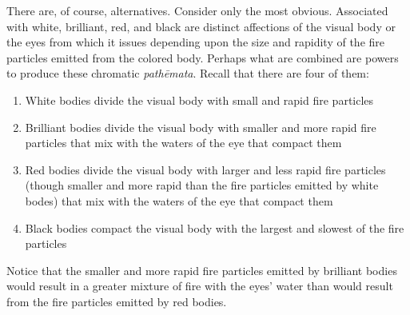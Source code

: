 There are, of course, alternatives. Consider only the most obvious. Associated with white, brilliant, red, and black are distinct affections of the visual body or the eyes from which it issues depending upon the size and rapidity of the fire particles emitted from the colored body. Perhaps what are combined are powers to produce these chromatic \emph{pathēmata}. Recall that there are four of them:
\begin{enumerate}[(1)]
	\item White bodies divide the visual body with small and rapid fire particles
	\item Brilliant bodies divide the visual body with smaller and more rapid fire particles that mix with the waters of the eye that compact them 
	\item Red bodies divide the visual body with larger and less rapid fire particles (though smaller and more rapid than the fire particles emitted by white bodes) that mix with the waters of the eye that compact them
	\item Black bodies compact the visual body with the largest and slowest of the fire particles
\end{enumerate}
Notice that the smaller and more rapid fire particles emitted by brilliant bodies would result in a greater mixture of fire with the eyes' water than would result from the fire particles emitted by red bodies.

